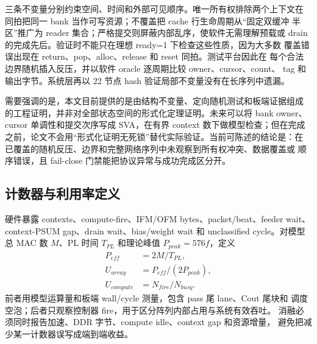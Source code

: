 三条不变量分别约束空间、时间和外部可见顺序。唯一所有权排除两个上下文在
同拍把同一 bank 当作可写资源；不覆盖把 cache 行生命周期从“固定双缓冲
半区”推广为 reader 集合；严格提交则屏蔽内部乱序，使软件无需理解预载或
drain 的完成先后。验证时不能只在理想 ready=1 下检查这些性质，因为大多数
覆盖错误出现在 return、pop、alloc、release 和 reset 同拍。测试平台因此在
每个合法边界随机插入反压，并以软件 oracle 逐周期比较 owner、cursor、count、
tag 和输出字节。系统层再以 22 节点 hash 验证局部不变量没有在长序列中遗漏。

需要强调的是，本文目前提供的是由结构不变量、定向随机测试和板端证据组成
的工程证明，并非对全部状态空间的形式化定理证明。未来可以将 bank owner、
cursor 单调性和提交次序写成 SVA，在有界 context 数下做模型检查；但在完成
之前，论文不会用“形式化证明无死锁”替代实际验证。当前可陈述的结论是：在
已覆盖的随机反压、边界和完整网络序列中未观察到所有权冲突、数据覆盖或
顺序错误，且 fail-close 门禁能把协议异常与成功完成区分开。

\subsection{计数器与利用率定义}

硬件暴露 contexts、compute-fire、IFM/OFM bytes、packet/beat、feeder wait、
context-PSUM gap、drain wait、bias/weight wait 和 unclassified cycle。对模型
总 MAC 数 $M$、PL 时间 $T_{PL}$ 和理论峰值 $P_{peak}=576f$，定义
\begin{align}
P_{eff}&=2M/T_{PL},\\
U_{array}&=P_{eff}/(2P_{peak}),\\
U_{compute}&=N_{fire}/N_{busy}.
\end{align}
前者用模型运算量和板端 wall/cycle 测量，包含 pass 尾 lane、Cout 尾块和
调度空泡；后者只观察控制器 fire，用于区分阵列内部占用与系统有效吞吐。
消融必须同时报告加速、DDR 字节、compute idle、context gap 和资源增量，
避免把减少某一计数器误写成端到端收益。
